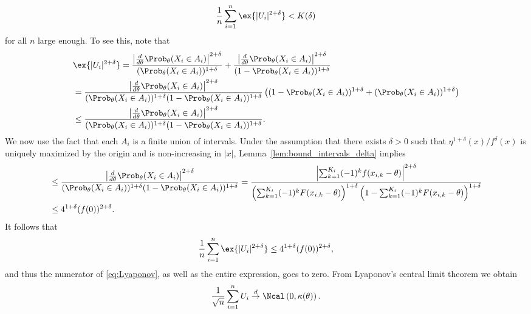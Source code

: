 \begin{align}
\frac{1}{n} \sum_{i=1}^n \ex{ |U_i|^{2+\delta}}  < K(\delta) \label{eq:Lyaponov_num}
\end{align} 
for all $n$ large enough. To see this, note that
\begin{align*}
& \ex{ |U_i|^{2+\delta} }= 
 \frac{ \left| \frac{d}{d\theta} \Prob_{\theta}(X_i \in A_i) \right|^{2+\delta}} {(\Prob_{\theta}(X_i \in A_i))^{1+\delta}} +  
  \frac{ \left|\frac{d}{d\theta} \Prob_{\theta}(X_i \in A_i) \right|^{2+\delta}} {(1-\Prob_{\theta}(X_i \in A_i))^{1+\delta}}  \\
  &  = \frac{\left| \frac{d}{d\theta} \Prob_{\theta}(X_i \in A_i) \right|^{2+\delta} }
  { (\Prob_{\theta}(X_i \in A_i))^{1+\delta} (1-\Prob_{\theta}(X_i \in A_i))^{1+\delta} } 
  \left( (1-\Prob_{\theta}(X_i \in A_i))^{1+\delta} + (\Prob_{\theta}(X_i \in A_i))^{1+\delta}   \right) \\
  &  \leq \frac{\left| \frac{d}{d\theta} \Prob_{\theta}(X_i \in A_i) \right|^{2+\delta} }
  { (\Prob_{\theta}(X_i \in A_i))^{1+\delta} (1-\Prob_{\theta}(X_i \in A_i))^{1+\delta}}. 
\end{align*}
We now use the fact that each $A_i$ is a finite union of intervals. Under the assumption that there exists $\delta>0$ such that $\eta^{1+\delta}(x)/f^\delta(x)$ is uniquely maximized by the origin and is non-increasing in $|x|$, Lemma~\ref{lem:bound_intervals_delta} implies
\begin{align*}
  &  \leq \frac{\left| \frac{d}{d\theta} \Prob_{\theta}(X_i \in A_i) \right|^{2+\delta} }
  { (\Prob_{\theta}(X_i \in A_i))^{1+\delta} (1-\Prob_{\theta}(X_i \in A_i))^{1+\delta}} = \frac{\left| \sum_{k=1}^{K_i} (-1)^k f(x_{i,k}-\theta) \right|^{2+\delta} }
  { \left( \sum_{k=1}^{K_i} (-1)^k F(x_{i,k}-\theta) \right)^{1+\delta} \left( 1 - \sum_{k=1}^{K_i} (-1)^k F(x_{i,k}-\theta) \right)^{1+\delta}} \\
  & \leq 4^{1+\delta}(f(0))^{2+\delta}.
\end{align*}
It follows that
\[
\frac{1}{n} \sum_{i=1}^n \ex{ |U_i|^{2+\delta}} \leq 4^{1+\delta}(f(0))^{2+\delta}, 
\]
and thus the numerator of \eqref{eq:Lyaponov}, as well as the entire expression, goes to zero. From Lyaponov's central limit theorem we obtain 
\[
\frac{1}{\sqrt{n}} \sum_{i=1}^n U_i \overset{d}{\rightarrow} \Ncal\left(0,\kappa(\theta) \right). 
\]


